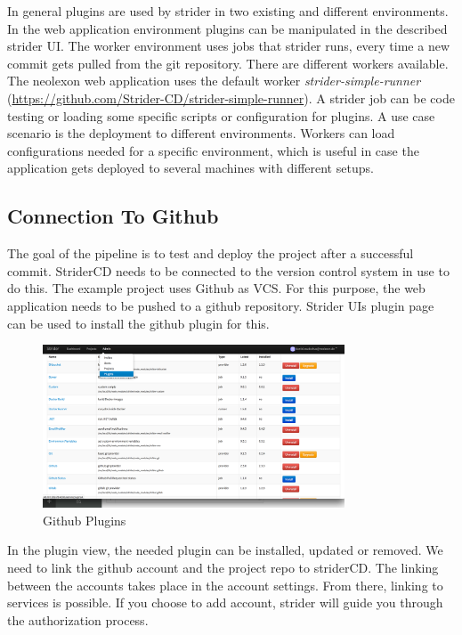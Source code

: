 In general plugins are used by strider in two existing and different environments. In the web application environment plugins can be manipulated
in the described strider UI. The worker environment uses jobs that strider runs, every time a new commit gets pulled from the git
repository. There are different workers available. The neolexon web application uses the default worker \textit{strider-simple-runner}
(\url{https://github.com/Strider-CD/strider-simple-runner}). A strider job can be code testing or loading some specific scripts or
configuration for plugins. A use case scenario is the deployment to different environments. Workers can load configurations needed for
a specific environment, which is useful in case the application gets deployed to several machines with different setups.

\subsection{Connection To Github}
\label{subsection:Connection To Github}
The goal of the pipeline is to test and deploy the project after a successful commit. StriderCD needs to be connected to the version
control system in use to do this. The example project uses Github as VCS. For this purpose, the web application needs to be pushed to a github repository.
Strider UIs plugin page can be used to install the github plugin for this.

\begin{figure}[h!]
  \centering
  \includegraphics[width=0.8\textwidth]{images/plugin_page.png}
  \caption{Github Plugins}
\end{figure}

In the plugin view, the needed plugin can be installed, updated or removed. We need to link the github account and the project repo to striderCD.
The linking between the accounts takes place in the account settings. From there, linking to services is possible. If you choose to add account, strider
will guide you through the authorization process.


